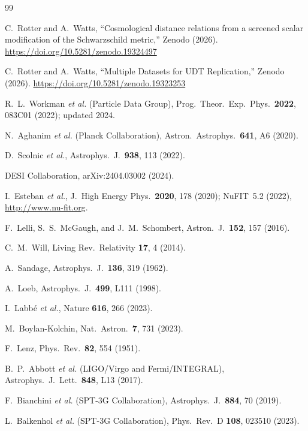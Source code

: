 \documentclass[aps,prd,twocolumn,superscriptaddress,nofootinbib,longbibliography]{revtex4-2}
\begin{document}
\begin{thebibliography}{99}

C.~Rotter and A.~Watts,
``Cosmological distance relations from a screened scalar
modification of the Schwarzschild metric,''
Zenodo (2026).
\url{https://doi.org/10.5281/zenodo.19324497}

C.~Rotter and A.~Watts,
``Multiple Datasets for UDT Replication,''
Zenodo (2026).
\url{https://doi.org/10.5281/zenodo.19323253}

R.~L.~Workman \textit{et al.} (Particle Data Group),
Prog.\ Theor.\ Exp.\ Phys.\ \textbf{2022}, 083C01 (2022);
updated 2024.

N.~Aghanim \textit{et al.} (Planck Collaboration),
Astron.\ Astrophys.\ \textbf{641}, A6 (2020).

D.~Scolnic \textit{et al.},
Astrophys.\ J.\ \textbf{938}, 113 (2022).

DESI Collaboration,
arXiv:2404.03002 (2024).

I.~Esteban \textit{et al.},
J.\ High Energy Phys.\ \textbf{2020}, 178 (2020);
NuFIT~5.2 (2022), \url{http://www.nu-fit.org}.

F.~Lelli, S.~S.~McGaugh, and J.~M.~Schombert,
Astron.\ J.\ \textbf{152}, 157 (2016).

C.~M.~Will,
Living Rev.\ Relativity \textbf{17}, 4 (2014).

A.~Sandage,
Astrophys.\ J.\ \textbf{136}, 319 (1962).

A.~Loeb,
Astrophys.\ J.\ \textbf{499}, L111 (1998).

I.~Labb\'{e} \textit{et al.},
Nature \textbf{616}, 266 (2023).

M.~Boylan-Kolchin,
Nat.\ Astron.\ \textbf{7}, 731 (2023).

F.~Lenz,
Phys.\ Rev.\ \textbf{82}, 554 (1951).

B.~P.~Abbott \textit{et al.} (LIGO/Virgo and Fermi/INTEGRAL),
Astrophys.\ J.\ Lett.\ \textbf{848}, L13 (2017).


F.~Bianchini \textit{et al.} (SPT-3G Collaboration),
Astrophys.\ J.\ \textbf{884}, 70 (2019).

L.~Balkenhol \textit{et al.} (SPT-3G Collaboration),
Phys.\ Rev.\ D \textbf{108}, 023510 (2023).


\end{thebibliography}
\end{document}
